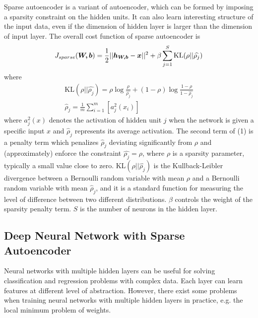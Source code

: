 \documentclass[runningheads]{article}
\begin{document}
Sparse autoencoder \cite{sae2011sparse,SAE2009_3790} is a variant of autoencoder, which can be formed by imposing a sparsity constraint on the hidden units. It can also learn interesting structure of the input data, even if the dimension of hidden layer is larger than the dimension of input layer. The overall cost function of sparse autoencoder is
\begin{equation}
	J_{sparse}(\bm{W,b}) = \frac{1}{2}||\bm{h_{W,b}}-\bm{x}||^{2} + \beta \sum_{j=1}^{S}\text{KL}(\rho||\widehat{\rho_j})\\
\end{equation}
where
\begin{gather}
\text{KL}(\rho||\widehat{\rho_j}) = \rho \log \frac{\rho}{\widehat{\rho_j}} + (1-\rho)\log \frac{1-\rho}{1-\widehat{\rho_j}}\\
\widehat\rho_j = \frac{1}{m} \sum_{i=1}^{m}[a_j^2(x_i)]
\end{gather}
where \emph{$a_j^2(x)$} denotes the activation of hidden unit \emph{$j$} when the network is given a specific input \emph{$x$} and \emph{$\widehat\rho_j$} represents its average activation. The second term of (1) is a penalty term which penalizes \emph{$\widehat\rho_j$} deviating significantly from \emph{$\rho$} and (approximately) enforce the constraint \emph{$\widehat{\rho_j} = \rho$}, where \emph{$\rho$} is a sparsity parameter, typically a small value close to zero. KL\emph{$(\rho||\widehat{\rho_j})$} is the Kullback-Leibler divergence \cite{kl1951information} between a Bernoulli random variable with mean \emph{$\rho$} and a Bernoulli random variable with mean \emph{$\widehat\rho_j$}, and it is a standard function for measuring the level of difference between two different distributions. \emph{$\beta$} controls the weight of the sparsity penalty term. \emph{$S$} is the number of neurons in the hidden layer.


\subsection{Deep Neural Network with Sparse Autoencoder}
Neural networks with multiple hidden layers can be useful for solving classification and regression problems with complex data. Each layer can learn features at different level of abstraction. However, there exist some problems when training neural networks with multiple hidden layers in practice, e.g. the local minimum problem of weights.  
\end{document}
